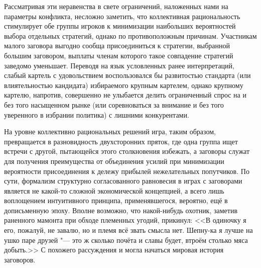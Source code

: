 Рассматривая эти неравенства в свете ограничений, наложенных нами на параметры конфликта, несложно заметить, что коллективная рациональность стимулирует обе группы игроков к минимизации наибольших вероятностей выбора отдельных стратегий, однако по противоположным причинам. Участникам малого заговора выгодно сообща присоединиться к стратегии, выбранной большим заговором, выплаты членам которого такое совпадение стратегий заведомо уменьшает. Переводя на язык условленных ранее интерпретаций, слабый картель с удовольствием воспользовался бы развитостью стандарта (или влиятельностью кандидата) избираемого крупным картелем, однако крупному картелю, напротив, совершенно не улыбается делить ограниченный спрос на и без того насыщенном рынке (или соревноваться за внимание и без того уверенного в избрании политика) с лишними конкурентами.

На уровне коллективно рациональных решений игра, таким образом, превращается в разновидность двухсторонних пряток, где одна группа ищет встречи с другой, пытающейся этого столкновения избежать, а заговоры служат для получения преимущества от объединения усилий при минимизации вероятности присоединения к дележу прибылей нежелательных попутчиков. По сути, формализм структурно согласованного равновесия в играх с заговорами является не какой-то сложной экономической концепцией, а всего лишь воплощением интуитивного принципа, применявшегося, вероятно, ещё в дописьменную эпоху. Вполне возможно, что накой-нибудь охотник, заметив раненного мамонта при обходе племенных угодий, прикинул: <<В одиночку я его, пожалуй, не завалю, но и племя всё звать смысла нет. Шепну-ка я лучше на ушко паре друзей "--- это ж сколько почёта и славы будет, втроём столько мяса добыть.>> С похожего рассуждения и могла начаться мировая история заговоров.

\FloatBarrier
